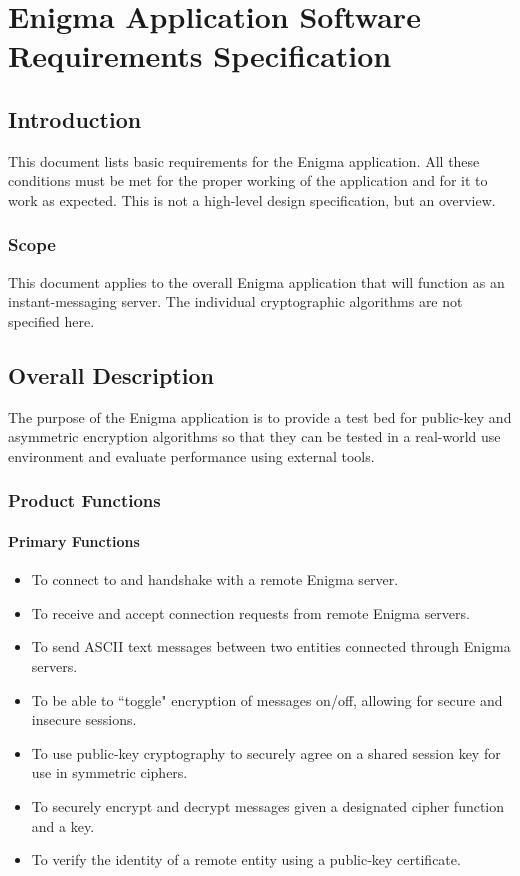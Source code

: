 
\chapter{Enigma Application Software Requirements Specification}
\label{AppendixA}

\section{Introduction}

This document lists basic requirements for the Enigma application. All these conditions must be met for the proper working of the application and for it to work as expected. This is not a high-level design specification, but an overview.

\subsection{Scope}

This document applies to the overall Enigma application that will function as an instant-messaging server. The individual cryptographic algorithms are not specified here.

\section{Overall Description}

The purpose of the Enigma application is to provide a test bed for public-key and asymmetric encryption algorithms so that they can be tested in a real-world use environment and evaluate performance using external tools.

\subsection{Product Functions}

\subsubsection{Primary Functions}

\begin{itemize}
  \item To connect to and handshake with a remote Enigma server.
  \item To receive and accept connection requests from remote Enigma servers.
  \item To send ASCII text messages between two entities connected through Enigma servers.
  \item To be able to ``toggle" encryption of messages on/off, allowing for secure and insecure sessions.
  \item To use public-key cryptography to securely agree on a shared session key for use in symmetric ciphers.
  \item To securely encrypt and decrypt messages given a designated cipher function and a key.
  \item To verify the identity of a remote entity using a public-key certificate.
\end{itemize}

